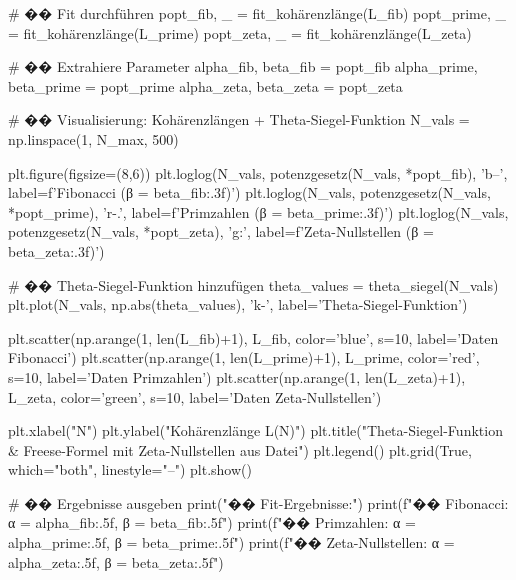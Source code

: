 # �� Fit durchführen
popt_fib, _ = fit_kohärenzlänge(L_fib)
popt_prime, _ = fit_kohärenzlänge(L_prime)
popt_zeta, _ = fit_kohärenzlänge(L_zeta)

# �� Extrahiere Parameter
alpha_fib, beta_fib = popt_fib
alpha_prime, beta_prime = popt_prime
alpha_zeta, beta_zeta = popt_zeta

# �� Visualisierung: Kohärenzlängen + Theta-Siegel-Funktion
N_vals = np.linspace(1, N_max, 500)

plt.figure(figsize=(8,6))
plt.loglog(N_vals, potenzgesetz(N_vals, *popt_fib), 'b--', label=f'Fibonacci (β = {beta_fib:.3f})')
plt.loglog(N_vals, potenzgesetz(N_vals, *popt_prime), 'r-.', label=f'Primzahlen (β = {beta_prime:.3f})')
plt.loglog(N_vals, potenzgesetz(N_vals, *popt_zeta), 'g:', label=f'Zeta-Nullstellen (β = {beta_zeta:.3f})')

# �� Theta-Siegel-Funktion hinzufügen
theta_values = theta_siegel(N_vals)
plt.plot(N_vals, np.abs(theta_values), 'k-', label='Theta-Siegel-Funktion')

plt.scatter(np.arange(1, len(L_fib)+1), L_fib, color='blue', s=10, label='Daten Fibonacci')
plt.scatter(np.arange(1, len(L_prime)+1), L_prime, color='red', s=10, label='Daten Primzahlen')
plt.scatter(np.arange(1, len(L_zeta)+1), L_zeta, color='green', s=10, label='Daten Zeta-Nullstellen')

plt.xlabel("N")
plt.ylabel("Kohärenzlänge L(N)")
plt.title("Theta-Siegel-Funktion & Freese-Formel mit Zeta-Nullstellen aus Datei")
plt.legend()
plt.grid(True, which="both", linestyle="--")
plt.show()

# �� Ergebnisse ausgeben
print("\n�� Fit-Ergebnisse:")
print(f"�� Fibonacci: α = {alpha_fib:.5f}, β = {beta_fib:.5f}")
print(f"�� Primzahlen: α = {alpha_prime:.5f}, β = {beta_prime:.5f}")
print(f"�� Zeta-Nullstellen: α = {alpha_zeta:.5f}, β = {beta_zeta:.5f}")